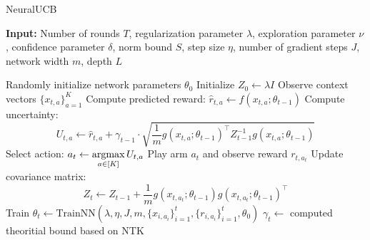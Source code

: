 \begin{algorithm}[h]
    \caption{NeuralUCB}
    \textbf{Input:} Number of rounds $T$, regularization parameter $\lambda$, exploration parameter $\nu$, confidence parameter $\delta$, norm bound $S$, step size $\eta$, number of gradient steps $J$, network width $m$, depth $L$

    \begin{algorithmic}[1]
    \State Randomly initialize network parameters $\theta_0$
    \State Initialize $Z_0 \gets \lambda I$
        \State Observe context vectors $\{x_{t,a}\}_{a=1}^K$
            \State Compute predicted reward: $\hat{r}_{t,a} \gets f(x_{t,a}; \theta_{t-1})$
            \State Compute uncertainty:
            \[
            U_{t,a} \gets \hat{r}_{t,a} + \gamma_{t-1} \cdot \sqrt{\frac{1}{m} g(x_{t,a};\theta_{t-1})^\top Z_{t-1}^{-1} g(x_{t,a};\theta_{t-1})}
            \]
        \EndFor
        \State Select action: $a_t \gets \mathop{\rm argmax}\limits_{a \in [K]} U_{t,a}$
        \State Play arm $a_t$ and observe reward $r_{t, a_t}$
        \State Update covariance matrix:
        \[
        Z_t \gets Z_{t-1} + \frac{1}{m} g(x_{t,a_t}; \theta_{t-1}) g(x_{t,a_t}; \theta_{t-1})^\top
        \]
        \State Train $\theta_t \gets \text{TrainNN}(\lambda, \eta, J, m, \{x_{i,a_i}\}_{i=1}^t, \{r_{i,a_i}\}_{i=1}^t, \theta_0)$
        \State $\gamma_t \gets$ computed theoritial bound based on NTK
    \EndFor
    \end{algorithmic}
\end{algorithm}

\newpage